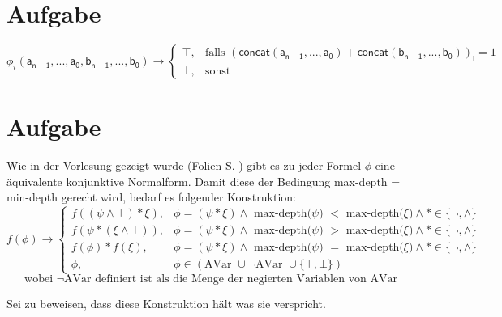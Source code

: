 \documentclass[a4paper,10pt]{scrartcl}
\begin{document}
\section{Aufgabe}
$$\phi_i\mathsf{(a_{n-1},...,a_0,b_{n-1},...,b_0)} \rightarrow 
\begin{cases} \top ,& \textrm{falls } \mathsf{(concat(a_{n-1},...,a_0) + concat(b_{n-1},...,b_0))_i}  = 1 \\ \bot,  & \textrm{sonst }\end{cases}$$
\section{Aufgabe}
Wie in der Vorlesung gezeigt wurde (Folien S. ) gibt es zu jeder Formel $\phi$ eine äquivalente konjunktive Normalform. Damit diese der Bedingung max-depth = min-depth gerecht wird, bedarf es folgender Konstruktion: \\
$$f(\phi) \rightarrow \begin{cases}f((\psi \land \top) * \xi), & \phi = (\psi * \xi) \land \textrm{ max-depth($\psi$) $<$ max-depth($\xi$)} \land * \in \{ \lnot, \land\} \\ f(\psi * (\xi \land \top)), & \phi = (\psi * \xi) \land \textrm{ max-depth($\psi$) $>$ max-depth($\xi$)} \land * \in \{ \lnot, \land\}  \\
f(\phi) * f(\xi), & \phi = (\psi * \xi) \land \textrm{ max-depth($\psi$) $=$ max-depth($\xi$)} \land * \in \{ \lnot, \land\} \\ \phi ,& \phi \in (\textrm{AVar } \cup \lnot\textrm{AVar } \cup \{\top, \bot  \})\end{cases} $$ $$ \textrm{wobei $\lnot$AVar definiert ist als die Menge der negierten Variablen von AVar} $$


Sei zu beweisen, dass diese Konstruktion hält was sie verspricht. 
\end{document}
